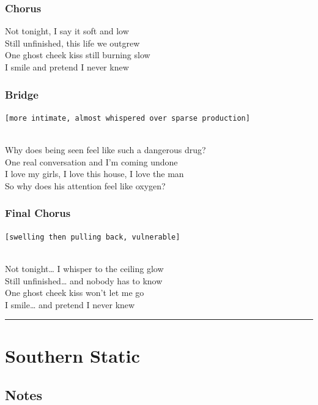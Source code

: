 \subsubsection{Chorus}\label{chorus-79}

Not tonight, I say it soft and low\\
Still unfinished, this life we outgrew\\
One ghost cheek kiss still burning slow\\
I smile and pretend I never knew

\subsubsection{Bridge}\label{bridge-27}

\texttt{{[}more\ intimate,\ almost\ whispered\ over\ sparse\ production{]}}\strut \\
Why does being seen feel like such a dangerous drug?\\
One real conversation and I'm coming undone\\
I love my girls, I love this house, I love the man\\
So why does his attention feel like oxygen?

\subsubsection{Final Chorus}\label{final-chorus-4}

\texttt{{[}swelling\ then\ pulling\ back,\ vulnerable{]}}\strut \\
Not tonight\ldots{} I whisper to the ceiling glow\\
Still unfinished\ldots{} and nobody has to know\\
One ghost cheek kiss won't let me go\\
I smile\ldots{} and pretend I never knew

\begin{center}\rule{0.5\linewidth}{0.5pt}\end{center}

\section{Southern Static}\label{southern-static}

\subsection{Notes}\label{notes-40}

